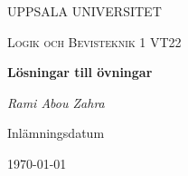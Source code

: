 \begin{titlepage}

  \centering
	{\scshape\LARGE UPPSALA UNIVERSITET\par}
	\vspace{1cm}
  {\scshape\Large {Logik och Bevisteknik 1 VT22} \par}
	\vspace{1.5cm}
  {\huge\bfseries {Lösningar till övningar} \par}
	\vspace{2cm}
	{\Large\itshape Rami Abou Zahra \par}
	\vfill
  \vfill


  {\large Inlämningsdatum}\par
  {\today}

\end{titlepage}
